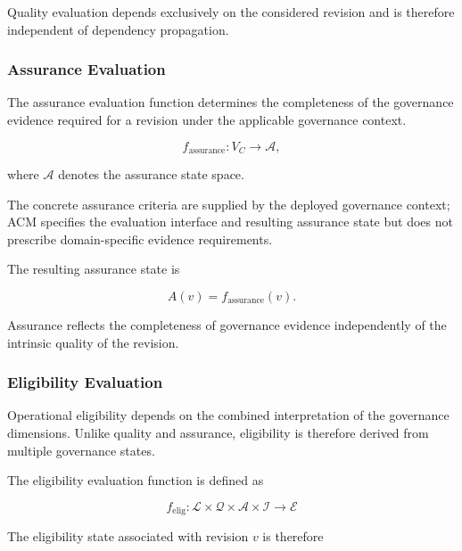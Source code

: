 \documentclass[10pt]{article}
\begin{document}
Quality evaluation depends exclusively on the considered revision and is therefore independent of dependency propagation.

\subsubsection{Assurance Evaluation}

The assurance evaluation function determines the completeness of the governance
evidence required for a revision under the applicable governance context.

\begin{equation}
	f_{\mathrm{assurance}} : V_C \rightarrow \mathcal{A},
	\label{eq:f_assurance}
\end{equation}

where $\mathcal{A}$ denotes the assurance state space.

The concrete assurance criteria are supplied by the deployed governance context; ACM specifies the evaluation interface and resulting assurance state but does not prescribe domain-specific evidence requirements.

The resulting assurance state is

\begin{equation}
	A(v)=f_{\mathrm{assurance}}(v).
	\label{eq:assurance_assignment}
\end{equation}

Assurance reflects the completeness of governance evidence independently of the intrinsic quality of the revision.

\subsubsection{Eligibility Evaluation}

Operational eligibility depends on the combined interpretation of the governance dimensions. Unlike quality and assurance, eligibility is therefore derived from multiple governance states.

The eligibility evaluation function is defined as

\begin{equation}
	\label{eq:eligibility_function}
	f_{\mathrm{elig}}
	:
	\mathcal{L}
	\times
	\mathcal{Q}
	\times
	\mathcal{A}
	\times
	\mathcal{I}
	\rightarrow
	\mathcal{E}
\end{equation}

The eligibility state associated with revision $v$ is therefore
\end{document}
